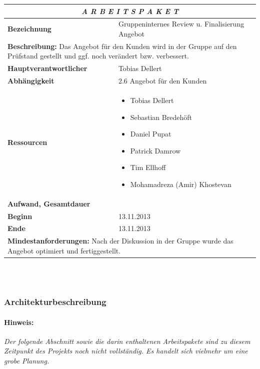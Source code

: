 \documentclass[fontsize=12pt,paper=a4,twoside]{scrartcl}
\begin{document}
\begin{tabular}{p{7.5cm}|p{7.5cm}}\toprule
\multicolumn{2}{c}{\textbf{\textit{A R B E I T S P A K E T \quad 2.8}}} \\ \toprule \hline
\textbf{Bezeichnung} & Gruppeninternes Review u. Finalisierung Angebot\\\hline
\multicolumn{2}{p{15cm}}{\textbf{Beschreibung:} \newline 
Das Angebot für den Kunden wird in der Gruppe auf den Prüfstand gestellt und ggf. noch verändert bzw. verbessert.}  \\\hline
\textbf{Hauptverantwortlicher} & Tobias Dellert \\\hline
\textbf{Abhängigkeit} & 2.6 Angebot für den Kunden\\\hline
\textbf{Ressourcen} & \begin{itemize} 
\itemsep0pt
\item Tobias Dellert
\item Sebastian Bredehöft
\item Daniel Pupat
\item Patrick Damrow
\item Tim Ellhoff
\item Mohamadreza (Amir) Khostevan
\end{itemize} \\\hline
\textbf{Aufwand, Gesamtdauer} & \\\hline
\textbf{Beginn} & 13.11.2013 \\\hline
\textbf{Ende} & 13.11.2013\\\hline
\multicolumn{2}{p{15cm}}{\textbf{Mindestanforderungen: } \newline
Nach der Diskussion in der Gruppe wurde das Angebot optimiert und fertiggestellt. }  \\ \toprule
\end{tabular} \\\\

\subsubsection{Architekturbeschreibung}\label{aps}

\paragraph{Hinweis:} \textit{Der folgende Abschnitt sowie die darin enthaltenen Arbeitspakete sind zu diesem Zeitpunkt des Projekts noch nicht vollständig. Es handelt sich vielmehr um eine grobe Planung.}\\
\end{document}
